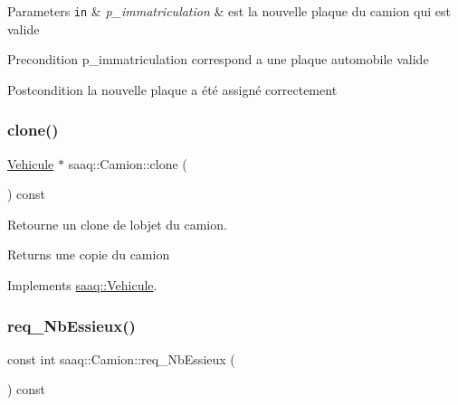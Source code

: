 \begin{DoxyParams}[1]{Parameters}
\mbox{\tt in}  & {\em p\+\_\+immatriculation} & est la nouvelle plaque du camion qui est valide \\
\hline
\end{DoxyParams}
\begin{DoxyPrecond}{Precondition}
p\+\_\+immatriculation correspond a une plaque automobile valide 
\end{DoxyPrecond}
\begin{DoxyPostcond}{Postcondition}
la nouvelle plaque a été assigné correctement 
\end{DoxyPostcond}
\mbox{\label{classsaaq_1_1Camion_aa4fe639e82878acf3fe578a8d80870d4}} 
\subsubsection{\texorpdfstring{clone()}{clone()}}
{\footnotesize\ttfamily \hyperlink{classsaaq_1_1Vehicule}{Vehicule} $\ast$ saaq\+::\+Camion\+::clone (\begin{DoxyParamCaption}{ }\end{DoxyParamCaption}) const\hspace{0.3cm}{\ttfamily [virtual]}}



Retourne un clone de l\textquotesingle{}objet du camion. 

\begin{DoxyReturn}{Returns}
une copie du camion 
\end{DoxyReturn}


Implements \hyperlink{classsaaq_1_1Vehicule}{saaq\+::\+Vehicule}.

\mbox{\label{classsaaq_1_1Camion_aeac12d82162c95755096025f93c8ddb7}} 
\subsubsection{\texorpdfstring{req\+\_\+\+Nb\+Essieux()}{req\_NbEssieux()}}
{\footnotesize\ttfamily const int saaq\+::\+Camion\+::req\+\_\+\+Nb\+Essieux (\begin{DoxyParamCaption}{ }\end{DoxyParamCaption}) const}



